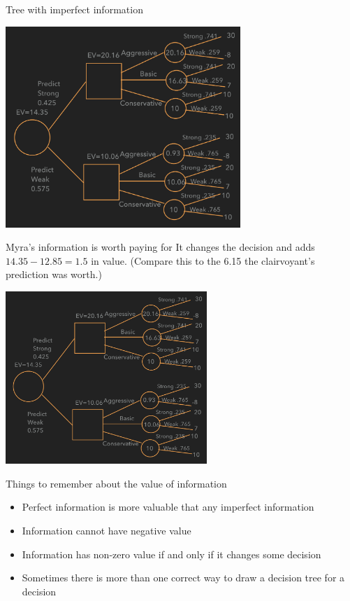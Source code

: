 \documentclass{beamer}\usepackage[]{graphicx}\usepackage[]{color}
\begin{document}
\begin{darkframes}
\begin{frame}[fragile]{Tree with imperfect information}
      \begin{center}
        \includegraphics[width=3.5in]{BevoImperfect} \\
      \end{center}

    \end{frame}


    \begin{frame}[fragile]{Myra's information is worth paying for}
       It changes the decision and adds $14.35 - 12.85 = 1.5$ in value. (Compare this to the 6.15 the clairvoyant's prediction was worth.)
      \begin{center}
        \includegraphics[width=3in]{BevoImperfect} \\
      \end{center}

    \end{frame}


    \begin{frame}[fragile]{Things to remember about the value of information}
          \begin{itemize} [<+->]
            \item Perfect information is more valuable that any imperfect information
            \item Information cannot have negative value
            \item Information has non-zero value if and only if it changes some decision
            \item Sometimes there is more than one correct way to draw a decision tree for a decision
          \end{itemize}   
    \end{frame}

  \end{darkframes}
\end{document}
